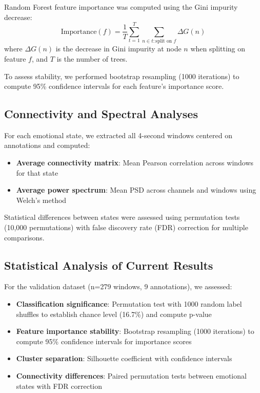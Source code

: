 Random Forest feature importance was computed using the Gini impurity decrease:
\begin{equation}
\text{Importance}(f) = \frac{1}{T} \sum_{t=1}^T \sum_{n \in t: \text{split on } f} \Delta G(n)
\end{equation}
where $\Delta G(n)$ is the decrease in Gini impurity at node $n$ when splitting on feature $f$, and $T$ is the number of trees.

To assess stability, we performed bootstrap resampling (1000 iterations) to compute 95\% confidence intervals for each feature's importance score.

\subsection{Connectivity and Spectral Analyses}

For each emotional state, we extracted all 4-second windows centered on annotations and computed:
\begin{itemize}
    \item \textbf{Average connectivity matrix}: Mean Pearson correlation across windows for that state
    \item \textbf{Average power spectrum}: Mean PSD across channels and windows using Welch's method
\end{itemize}

Statistical differences between states were assessed using permutation tests (10,000 permutations) with false discovery rate (FDR) correction for multiple comparisons.

\subsection{Statistical Analysis of Current Results}

For the validation dataset (n=279 windows, 9 annotations), we assessed:

\begin{itemize}
    \item \textbf{Classification significance}: Permutation test with 1000 random label shuffles to establish chance level (16.7\%) and compute p-value
    \item \textbf{Feature importance stability}: Bootstrap resampling (1000 iterations) to compute 95\% confidence intervals for importance scores
    \item \textbf{Cluster separation}: Silhouette coefficient with confidence intervals
    \item \textbf{Connectivity differences}: Paired permutation tests between emotional states with FDR correction
\end{itemize}

